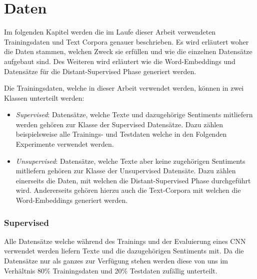 \chapter{Daten}
Im  folgenden Kapitel werden die im Laufe dieser Arbeit verwendeten Trainingsdaten und Text Corpora genauer beschrieben. Es wird erläutert woher die Daten stammen, welchen Zweck sie erfüllen und wie die einzelnen Datensätze aufgebaut sind. Des Weiteren wird erläutert wie die Word-Embeddings und Datensätze für die Distant-Supervised Phase generiert werden.

Die Trainingsdaten, welche in dieser Arbeit verwendet werden, können in zwei Klassen unterteilt werden:

\begin{itemize}
	\item \emph{Supervised}: Datensätze, welche Texte und dazugehörige Sentiments mitliefern werden gehören zur Klasse der Supervised Datensätze. Dazu zählen beispielsweise alle Trainings- und Testdaten welche in den Folgenden Experimente verwendet werden.
	\item \emph{Unsupervised}: Datensätze, welche Texte aber keine zugehörigen Sentiments mitliefern gehören zur Klasse der Unsupervised Datensäte. Dazu zählen einerseits die Daten, mit welchen die Distant-Supervised Phase durchgeführt wird. Andererseits gehören hierzu auch die Text-Corpora mit welchen die Word-Embeddings generiert werden.
\end{itemize}

\clearpage

\subsection{Supervised}
\label{data:supervised_data}
Alle Datensätze welche während des Trainings und der Evaluierung eines \gls{CNN} verwendet werden liefern Texte und die dazugehörigen Sentiments mit. Da die Datensätze nur als ganzes zur Verfügung stehen werden diese von uns im Verhältnis 80\% Trainingsdaten und 20\% Testdaten zufällig unterteilt.

